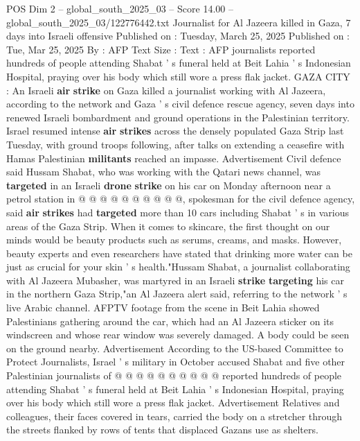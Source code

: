 \begin{textsample}{POS Dim 2 – global\_south\_2025\_03 – Score 14.00 – global\_south\_2025\_03/122776442.txt}  \label{ex:f2_pos_290}
Journalist for Al Jazeera killed in Gaza, 7 days into Israeli offensive Published on : Tuesday, March 25, 2025 Published on : Tue, Mar 25, 2025 By : AFP Text Size : Text : AFP journalists reported hundreds of people attending Shabat ' s funeral held at Beit Lahia ' s Indonesian Hospital, praying over his body which still wore a press flak jacket.
GAZA CITY : An Israeli \textbf{air} \textbf{strike} on Gaza killed a journalist working with Al Jazeera, according to the network and Gaza ' s civil defence rescue agency, seven days into renewed Israeli bombardment and ground operations in the Palestinian territory.
Israel resumed intense \textbf{air} \textbf{strikes} across the densely populated Gaza Strip last Tuesday, with ground troops following, after talks on extending a ceasefire with Hamas Palestinian \textbf{militants} reached an impasse.
Advertisement Civil defence said Hussam Shabat, who was working with the Qatari news channel, was \textbf{targeted} in an Israeli \textbf{drone} \textbf{strike} on his car on Monday afternoon near a petrol station in @ @ @ @ @ @ @ @ @ @, spokesman for the civil defence agency, said \textbf{air} \textbf{strikes} had \textbf{targeted} more than 10 cars including Shabat ' s in various areas of the Gaza Strip.
When it comes to skincare, the first thought on our minds would be beauty products such as serums, creams, and masks.
However, beauty experts and even researchers have stated that drinking more water can be just as crucial for your skin ' s health."Hussam Shabat, a journalist collaborating with Al Jazeera Mubasher, was martyred in an Israeli \textbf{strike} \textbf{targeting} his car in the northern Gaza Strip,"an Al Jazeera alert said, referring to the network ' s live Arabic channel.
AFPTV footage from the scene in Beit Lahia showed Palestinians gathering around the car, which had an Al Jazeera sticker on its windscreen and whose rear window was severely damaged.
A body could be seen on the ground nearby.
Advertisement According to the US-based Committee to Protect Journalists, Israel ' s military in October accused Shabat and five other Palestinian journalists of @ @ @ @ @ @ @ @ @ @ reported hundreds of people attending Shabat ' s funeral held at Beit Lahia ' s Indonesian Hospital, praying over his body which still wore a press flak jacket.
Advertisement Relatives and colleagues, their faces covered in tears, carried the body on a stretcher through the streets flanked by rows of tents that displaced Gazans use as shelters.

\end{textsample}
